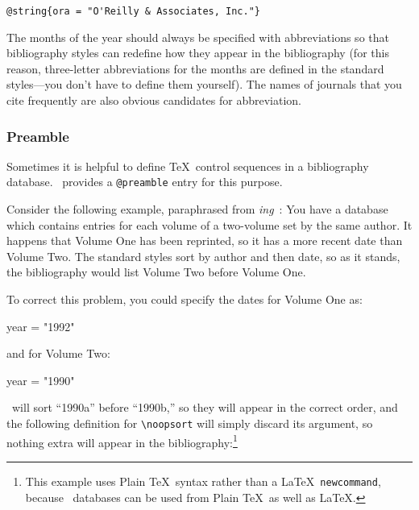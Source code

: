 \begin{ttindent}
\verb|@string{ora = "O'Reilly & Associates, Inc."}|
\end{ttindent}

The months of the year should always be specified with abbreviations
so that bibliography styles can redefine how they appear in the
bibliography (for this reason, three-letter abbreviations
for the months are defined in the standard styles---you don't have to
define them yourself).  The names of journals that you cite frequently are
also obvious candidates for abbreviation.

\subsubsection{Preamble}

Sometimes 
it is helpful to define \TeX\ control sequences in a
bibliography database.  \BibTeX\ provides a \verb|@preamble| entry for
this purpose.

Consider the following example, paraphrased
from \textit{\BibTeX{}ing}~\cite{op:btxdoc}: You have a database which contains entries
for each volume of a two-volume set by the same author.  It happens that
Volume One has been reprinted, so it has a more recent date than Volume Two.
The standard styles sort by author and then date, so as it stands, the
bibliography would list Volume Two before Volume One.

To correct this problem, you could specify the dates for Volume One as:

\begin{shortexample}
year = "{}1992"
\end{shortexample}

and for Volume Two:

\begin{shortexample}
year = "{}1990"
\end{shortexample}

\BibTeX\ will sort ``1990a'' before ``1990b,'' so they
will appear in the correct order, and the following definition for
\verb|\noopsort| will simply discard its argument, so nothing extra
will appear in the bibliography:\footnote{This example uses Plain \TeX\
syntax rather than a \LaTeX\ \texttt{\bs newcommand}, because \BibTeX\
databases can be used from Plain \TeX\ as well as \LaTeX.}

\begin{shortexample}
\def\noopsort#1{}
\end{shortexample}

